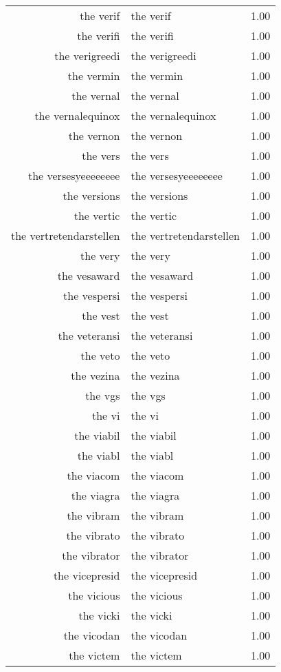 \begin{table}[ht]
\begin{tabular}{rlr}
  the verif & the verif & 1.00 \\ 
  the verifi & the verifi & 1.00 \\ 
  the verigreedi & the verigreedi & 1.00 \\ 
  the vermin & the vermin & 1.00 \\ 
  the vernal & the vernal & 1.00 \\ 
  the vernalequinox & the vernalequinox & 1.00 \\ 
  the vernon & the vernon & 1.00 \\ 
  the vers & the vers & 1.00 \\ 
  the versesyeeeeeeee & the versesyeeeeeeee & 1.00 \\ 
  the versions & the versions & 1.00 \\ 
  the vertic & the vertic & 1.00 \\ 
  the vertretendarstellen & the vertretendarstellen & 1.00 \\ 
  the very & the very & 1.00 \\ 
  the vesaward & the vesaward & 1.00 \\ 
  the vespersi & the vespersi & 1.00 \\ 
  the vest & the vest & 1.00 \\ 
  the veteransi & the veteransi & 1.00 \\ 
  the veto & the veto & 1.00 \\ 
  the vezina & the vezina & 1.00 \\ 
  the vgs & the vgs & 1.00 \\ 
  the vi & the vi & 1.00 \\ 
  the viabil & the viabil & 1.00 \\ 
  the viabl & the viabl & 1.00 \\ 
  the viacom & the viacom & 1.00 \\ 
  the viagra & the viagra & 1.00 \\ 
  the vibram & the vibram & 1.00 \\ 
  the vibrato & the vibrato & 1.00 \\ 
  the vibrator & the vibrator & 1.00 \\ 
  the vicepresid & the vicepresid & 1.00 \\ 
  the vicious & the vicious & 1.00 \\ 
  the vicki & the vicki & 1.00 \\ 
  the vicodan & the vicodan & 1.00 \\ 
  the victem & the victem & 1.00 \\ 

\end{tabular}
\end{table}
